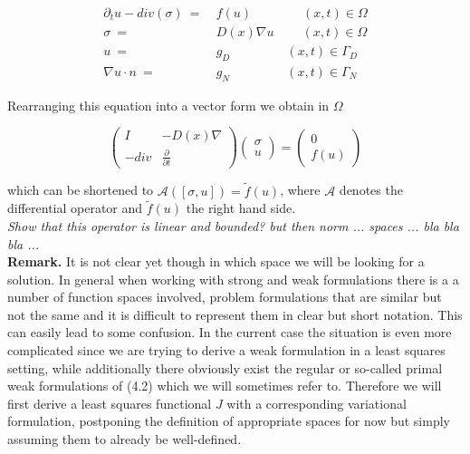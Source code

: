 \documentclass[../draft_1.tex]{subfiles}
\begin{document}
\begin{ceqn}
	\begin{equation}
	\begin{aligned}
	 \partial_t u - div(\sigma) \ =& \ f(u) \qquad \qquad (x,t) \in \Omega \\
	\sigma \ =& \ D(x)  \nabla u \ \qquad (x,t) \in \Omega  \\
	u \ =& \ g_D  \ \ \qquad  \qquad (x,t) \in \Gamma_D \\
	\nabla u \cdot n \ =& \ g_N  \ \ \qquad \qquad (x,t) \in \Gamma_N
	\end{aligned}
	\end{equation}
\end{ceqn}
Rearranging this equation into a vector form we obtain in $\Omega$
\begin{ceqn}
	\begin{equation}
	\begin{pmatrix}
	I & - D(x) \nabla \\
	- div & \frac{\partial}{\partial t} 
	\end{pmatrix}
	\begin{pmatrix}
	\sigma \\
	u
	\end{pmatrix} = 
	\begin{pmatrix}
	0 \\
	f(u)
	\end{pmatrix}
	\end{equation}
\end{ceqn}
which can be shortened to $\mathcal{A} ([\sigma, u]) = \tilde{f}(u)$, where $\mathcal{A}$ denotes the differential operator and $\tilde{f}(u)$ the right hand side. 
\smallskip
\\
\textit{Show that this operator is linear and bounded? but then norm ... spaces ... bla bla bla ...}
\smallskip
\\
\textbf{Remark.} It is not clear yet though in which space we will be looking for a solution. In general when working with strong and weak formulations there is a a number of function spaces involved, problem formulations that are similar but not the same and it is difficult to represent them in clear but short notation. This can easily lead to some confusion. In the current case the situation is even more complicated since we are trying to derive a weak formulation in a least squares setting, while additionally there obviously exist the regular or so-called primal weak formulations of (4.2) which we will sometimes refer to. Therefore we will first derive  a least squares functional $J$ with a corresponding variational formulation, postponing the definition of appropriate spaces for now but simply assuming them to already be well-defined. 
\end{document}
